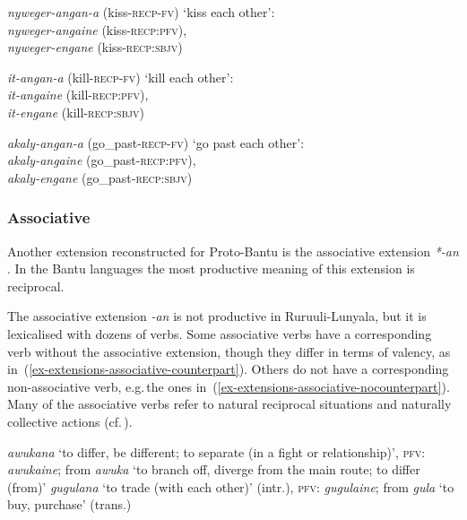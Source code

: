 \ea
\label{ex-extensions-reciprocal-pfv}
\begin{xlist}

\ex\textit{nyweger-angan-a} (kiss-\textsc{recp-fv}) `kiss each other':\\
\textit{nyweger-angaine} (kiss-\textsc{recp:pfv}), \\
\textit{nyweger-engane} (kiss-\textsc{recp:sbjv})

\ex\textit{it-angan-a} (kill-\textsc{recp-fv}) `kill each other':\\
\textit{it-angaine} (kill-\textsc{recp:pfv}), \\
\textit{it-engane} (kill-\textsc{recp:sbjv})

\ex\textit{akaly-angan-a} (go\_past-\textsc{recp-fv}) `go past each other': \\ 
\textit{akaly-angaine} (go\_past-\textsc{recp:pfv}), \\
\textit{akaly-engane} (go\_past-\textsc{recp:sbjv})
\end{xlist}
\z

\subsubsection{Associative}\label{sec-extension-associative}

Another extension reconstructed for Proto-Bantu is the associative extension \textit{*-an} \citep[173, 182–184]{Schadebergetal2019Bantu}. 
In the Bantu languages the most productive meaning of this extension is reciprocal. 

The associative extension \textit{-an} is not productive in Ru\-ruu\-li\hyp{}Lu\-nya\-la, but it is lexicalised with dozens of verbs. 
Some associative verbs have a corresponding verb without the associative extension, though they differ in terms of valency, as in~(\ref{ex-extensions-associative-counterpart}). 
Others do not have a corresponding non-associative verb, e.g.\,the ones in~(\ref{ex-extensions-associative-nocounterpart}). 
Many of the associative verbs refer to natural reciprocal situations and naturally collective actions
(cf.\,\citealt[267–270]{Kemmer1993Middle}).

\ea \label{ex-extensions-associative-counterpart}
\begin{xlist}
\ex \textit{awukana} `to differ, be different; to separate (in a fight or relationship)', \textsc{pfv}: \textit{awukaine}; 
from \textit{awuka} `to branch off, diverge from the main route; to differ (from)' 
\ex \textit{gugulana} `to trade (with each other)' (intr.),  \textsc{pfv}: \textit{gugulaine};  from \textit{gula} `to buy, purchase' (trans.)
\end{xlist}
\z

